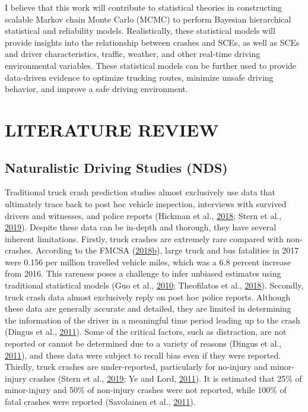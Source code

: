 \documentclass[12pt]{book}
\numberwithin{equation}{chapter}
\begin{document}
I believe that this work will contribute to statistical theories in constructing scalable Markov chain Monte Carlo (MCMC) to perform Bayesian hierarchical statistical and reliability models. Realistically, these statistical models will provide insights into the relationship between crashes and SCEs, as well as SCEs and driver characteristics, traffic, weather, and other real-time driving environmental variables. These statistical models can be further used to provide data-driven evidence to optimize trucking routes, minimize unsafe driving behavior, and improve a safe driving environment.

\hypertarget{literature-review}{%
\chapter{LITERATURE REVIEW}\label{literature-review}}

\hypertarget{naturalistic-driving-studies-nds}{%
\section{Naturalistic Driving Studies (NDS)}\label{naturalistic-driving-studies-nds}}

Traditional truck crash prediction studies almost exclusively use data that ultimately trace back to post hoc vehicle inspection, interviews with survived drivers and witnesses, and police reports (Hickman et al., \protect\hyperlink{ref-hickman2018synthetic}{2018}; Stern et al., \protect\hyperlink{ref-stern2019data}{2019}). Despite these data can be in-depth and thorough, they have several inherent limitations. Firstly, truck crashes are extremely rare compared with non-crashes. According to the FMCSA (\protect\hyperlink{ref-fmcsareport2017}{2018}\protect\hyperlink{ref-fmcsareport2017}{b}), large truck and bus fatalities in 2017 were 0.156 per million travelled vehicle miles, which was a 6.8 percent increase from 2016. This rareness poses a challenge to infer unbiased estimates using traditional statistical models (Guo et al., \protect\hyperlink{ref-guo2010near}{2010}; Theofilatos et al., \protect\hyperlink{ref-theofilatos2018impact}{2018}). Secondly, truck crash data almost exclusively reply on post hoc police reports. Although these data are generally accurate and detailed, they are limited in determining the information of the driver in a meaningful time period leading up to the crash (Dingus et al., \protect\hyperlink{ref-dingus2011estimating}{2011}). Some of the critical factors, such as distraction, are not reported or cannot be determined due to a variety of reasons (Dingus et al., \protect\hyperlink{ref-dingus2011estimating}{2011}), and these data were subject to recall bias even if they were reported. Thirdly, truck crashes are under-reported, particularly for no-injury and minor-injury crashes (Stern et al., \protect\hyperlink{ref-stern2019data}{2019}; Ye and Lord, \protect\hyperlink{ref-ye2011investigation}{2011}). It is estimated that 25\% of minor-injury and 50\% of non-injury crashes were not reported, while 100\% of fatal crashes were reported (Savolainen et al., \protect\hyperlink{ref-savolainen2011statistical}{2011}).
\end{document}
